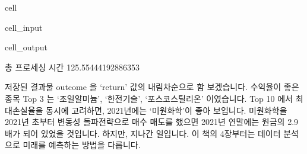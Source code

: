 \documentclass[letterpaper,10pt,english]{jupyterBook}
\begin{document}
\begin{sphinxuseclass}{cell}
\begin{sphinxVerbatimInput}
\begin{sphinxuseclass}{cell_input}
\begin{sphinxVerbatim}[commandchars=\\\{\}]

               

  
\end{sphinxVerbatim}

\end{sphinxuseclass}\end{sphinxVerbatimInput}
\begin{sphinxVerbatimOutput}

\begin{sphinxuseclass}{cell_output}
\begin{sphinxVerbatim}[commandchars=\\\{\}]
총 프로세싱 시간 125.55444192886353
\end{sphinxVerbatim}

\end{sphinxuseclass}\end{sphinxVerbatimOutput}

\end{sphinxuseclass}
\sphinxAtStartPar
 저장된 결과물 outcome 을 ‘return’ 값의 내림차순으로 함 보겠습니다. 수익율이 좋은 종목 Top 3 는 ‘조일알미늄’, ‘한전기술’, ‘포스코스틸리온’ 이였습니다. Top 10 에서 최대손실율을 동시에 고려하면, 2021년에는 ‘미원화학’이 좋아 보입니다. 미원화학을 2021년 초부터 변동성 돌파전략으로 매수 매도를 했으면 2021년 연말에는 원금의 2.9배가 되어 있었을 것입니다. 하지만, 지나간 일입니다. 이 책의 4장부터는 데이터 분석으로 미래를 예측하는 방법을 다룹니다.
\end{document}
